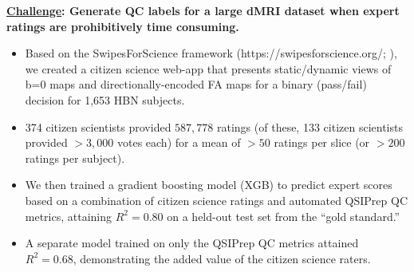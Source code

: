 \documentclass[a0paper,landscape,fontscale=0.395]{baposter}
\begin{document}
\begin{poster}
{\vspace{0.5em}
\noindent\textbf{%
    \underline{Challenge}: %
    Generate QC labels for a large dMRI dataset when expert ratings are prohibitively time consuming.%
}
\vspace{0.5em}

\begin{itemize}[noitemsep, leftmargin=*]
    \item Based on the SwipesForScience framework
    (https://swipesforscience.org/; \cite{keshavan2019citizen}), we created a
    citizen science web-app that presents static/dynamic views of b=0 maps and
    directionally-encoded FA maps for a binary (pass/fail) decision for 1,653
    HBN subjects.
    \item 374 citizen scientists provided $587,778$ ratings (of these, 133
    citizen scientists provided $>3,000$ votes each) for a mean of $>50$ ratings
    per slice (or $>200$ ratings per subject).
    \item We then trained a gradient boosting model (XGB) to predict expert scores
    based on a combination of citizen science ratings and automated QSIPrep QC
    metrics, attaining $R^2 = 0.80$ on a held-out test set from the ``gold standard.''
    \item A separate model trained on only the QSIPrep QC metrics attained $R^2 = 0.68$,
    demonstrating the added value of the citizen science raters.
\end{itemize}

}
\end{poster}
\end{document}
